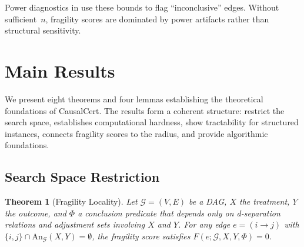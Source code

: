 \documentclass[11pt,a4paper]{article}
\newtheorem{theorem}{Theorem}[section]
\theoremstyle{definition}
\theoremstyle{remark}
\newcommand{\DAG}{\mathcal{G}}
\newcommand{\An}{\mathrm{An}}
\newcommand{\fragility}{F}
\newcommand{\Phi}{\varPhi}
\begin{document}
Power diagnostics in  use these bounds to flag ``inconclusive''
edges. Without sufficient~$n$, fragility scores are dominated by power artifacts rather
than structural sensitivity.


\section{Main Results}\label{sec:results}

We present eight theorems and four lemmas establishing the theoretical foundations of
CausalCert. The results form a coherent structure: 
restrict the search space,  establishes computational hardness,
 show tractability for structured instances,
 connects fragility scores to the radius, and
 provide algorithmic foundations.

\subsection{Search Space Restriction}

\begin{theorem}[Fragility Locality]\label{thm:locality}
Let $\DAG = (V, E)$ be a DAG, $X$ the treatment, $Y$ the outcome, and $\Phi$ a
conclusion predicate that depends only on d-separation relations and adjustment sets
involving $X$ and $Y$. For any edge $e = (i \to j)$ with
$\{i, j\} \cap \An_\DAG(X, Y) = \emptyset$, the fragility score satisfies
$\fragility(e; \DAG, X, Y, \Phi) = 0$.
\end{theorem}
\end{document}
